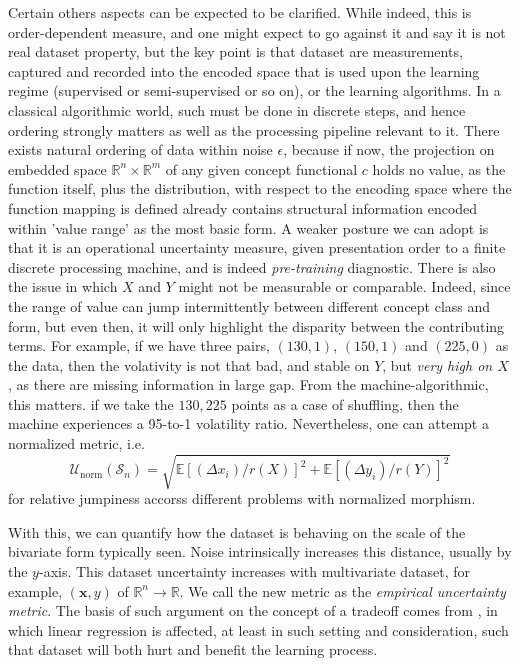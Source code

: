 \documentclass[
  journal=largetwo,
  year=2025,
  volume=37,
]{cup-journal}
\begin{document}
Certain others aspects can be expected to be clarified. While indeed, this is order-dependent measure, and one might expect to go against it and say it is not real dataset property, but the key point is that dataset are measurements, captured and recorded into the encoded space that is used upon the learning regime (supervised or semi-supervised or so on), or the learning algorithms. In a classical algorithmic world, such must be done in discrete steps, and hence ordering strongly matters as well as the processing pipeline relevant to it. There exists natural ordering of data within noise $\epsilon$, because if now, the projection on embedded space $\mathbb{R}^{n}\times \mathbb{R}^{m}$ of any given concept functional $c$ holds no value, as the function itself, plus the distribution, with respect to the encoding space where the function mapping is defined already contains structural information encoded within 'value range' as the most basic form. A weaker posture we can adopt is that it is an operational uncertainty measure, given presentation order to a finite discrete processing machine, and is indeed \textit{pre-training} diagnostic. There is also the issue in which $X$ and $Y$ might not be measurable or comparable. Indeed, since the range of value can jump intermittently between different concept class and form, but even then, it will only highlight the disparity between the contributing terms. For example, if we have three pairs, $(130,1)$, $(150,1)$ and $(225,0)$ as the data, then the volativity is not that bad, and stable on $Y$, but \textit{very high on $X$}, as there are missing information in large gap. From the machine-algorithmic, this matters. if we take the $130,225$ points as a case of shuffling, then the machine experiences a 95-to-1 volatility ratio. Nevertheless, one can attempt a normalized metric, i.e. 
\begin{equation}
    \mathcal{U}_{\mathrm{norm}}(\mathcal{S}_{n}) = \sqrt{\mathbb{E}[(\Delta x_{i})/r(X)]^{2}+\mathbb{E}[(\Delta y_{i})/r(Y)]^{2}}
\end{equation}
for relative jumpiness accorss different problems with normalized morphism. 

With this, we can quantify how the dataset is behaving on the scale of the bivariate form typically seen. Noise intrinsically increases this distance, usually by the $y$-axis. This dataset uncertainty increases with multivariate dataset, for example, $(\mathbf{x},y)$ of $\mathbb{R}^{n}\to\mathbb{R}$. We call the new metric as the \textit{empirical uncertainty metric}. The basis of such argument on the concept of a tradeoff comes from \cite{nakkiran2019datahurtlinearregression}, in which linear regression is affected, at least in such setting and consideration, such that dataset will both hurt and benefit the learning process. 
\end{document}
